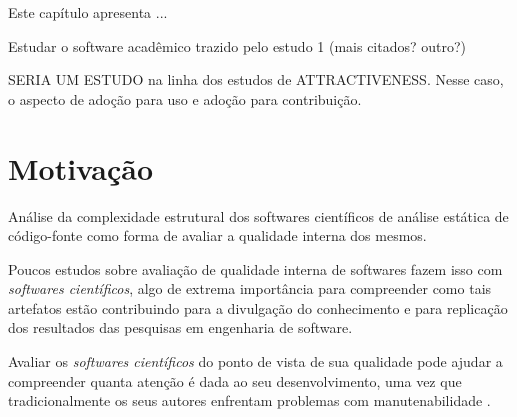 {Este capítulo apresenta ...}


Estudar o software acadêmico trazido pelo estudo 1 (mais citados? outro?)

SERIA UM ESTUDO na linha dos estudos de  ATTRACTIVENESS.
Nesse caso, o aspecto de adoção para uso e adoção para contribuição.

\section{Motivação}


Análise da complexidade estrutural dos softwares científicos de análise
estática de código-fonte como forma de avaliar a qualidade interna dos mesmos.

%

Poucos estudos sobre avaliação de qualidade interna de softwares fazem isso com
{\it softwares científicos}, algo de extrema importância para compreender como
tais artefatos estão contribuindo para a divulgação do conhecimento e para
replicação dos resultados das pesquisas em engenharia de software.

Avaliar os {\it softwares científicos} do ponto de vista de sua qualidade pode
ajudar a compreender quanta atenção é dada ao seu desenvolvimento, uma vez que
tradicionalmente os seus autores enfrentam problemas com manutenabilidade
\cite{Prlic2012}.

%
%
%
%
%



